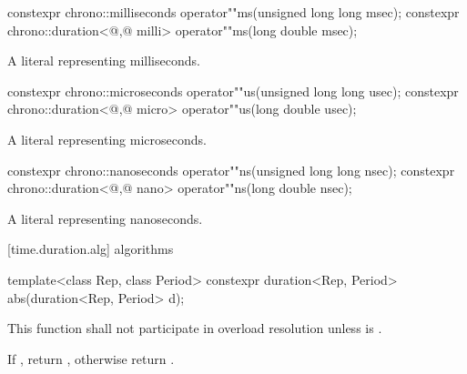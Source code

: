 %
\begin{itemdecl}
constexpr chrono::milliseconds                 operator""ms(unsigned long long msec);
constexpr chrono::duration<@\unspec,@ milli> operator""ms(long double msec);
\end{itemdecl}

\begin{itemdescr}
\pnum
\returns
A  literal representing  milliseconds.
\end{itemdescr}

%
\begin{itemdecl}
constexpr chrono::microseconds                 operator""us(unsigned long long usec);
constexpr chrono::duration<@\unspec,@ micro> operator""us(long double usec);
\end{itemdecl}

\begin{itemdescr}
\pnum
\returns
A  literal representing  microseconds.
\end{itemdescr}

%
\begin{itemdecl}
constexpr chrono::nanoseconds                 operator""ns(unsigned long long nsec);
constexpr chrono::duration<@\unspec,@ nano> operator""ns(long double nsec);
\end{itemdecl}

\begin{itemdescr}
\pnum
\returns
A  literal representing  nanoseconds.
\end{itemdescr}

[time.duration.alg]{ algorithms}

%
\begin{itemdecl}
template<class Rep, class Period>
  constexpr duration<Rep, Period> abs(duration<Rep, Period> d);
\end{itemdecl}

\begin{itemdescr}
\pnum
\remarks This function shall not participate in overload resolution
unless  is .

\pnum
\returns If , return ,
otherwise return .
\end{itemdescr}

